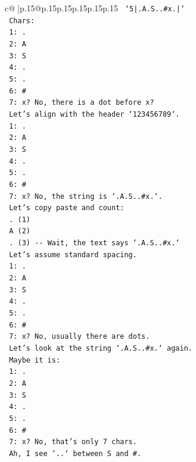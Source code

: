 \documentclass{article}
\begin{document}
{\begin{supertabular}{c@{$\;$}|p{.15\linewidth}@{}p{.15\linewidth}p{.15\linewidth}p{.15\linewidth}p{.15\linewidth}p{.15\linewidth}}
{{{\texttt{   `5|.A.S..\#x.|`} \\
\texttt{   Chars:} \\
\texttt{   1: .} \\
\texttt{   2: A} \\
\texttt{   3: S} \\
\texttt{   4: .} \\
\texttt{   5: .} \\
\texttt{   6: \#} \\
\texttt{   7: x? No, there is a dot before x?} \\
\texttt{   Let's align with the header `123456789`.} \\
\texttt{   1: .} \\
\texttt{   2: A} \\
\texttt{   3: S} \\
\texttt{   4: .} \\
\texttt{   5: .} \\
\texttt{   6: \#} \\
\texttt{   7: x? No, the string is `.A.S..\#x.`.} \\
\texttt{   Let's copy paste and count:} \\
\texttt{   . (1)} \\
\texttt{   A (2)} \\
\texttt{   . (3) {-}{-} Wait, the text says `.A.S..\#x.`} \\
\texttt{   Let's assume standard spacing.} \\
\texttt{   1: .} \\
\texttt{   2: A} \\
\texttt{   3: S} \\
\texttt{   4: .} \\
\texttt{   5: .} \\
\texttt{   6: \#} \\
\texttt{   7: x? No, usually there are dots.} \\
\texttt{   Let's look at the string `.A.S..\#x.` again.} \\
\texttt{   Maybe it is:} \\
\texttt{   1: .} \\
\texttt{   2: A} \\
\texttt{   3: S} \\
\texttt{   4: .} \\
\texttt{   5: .} \\
\texttt{   6: \#} \\
\texttt{   7: x? No, that's only 7 chars.} \\
\texttt{   Ah, I see `..` between S and \#.} \\
}}}
\end{supertabular}}
\end{document}
